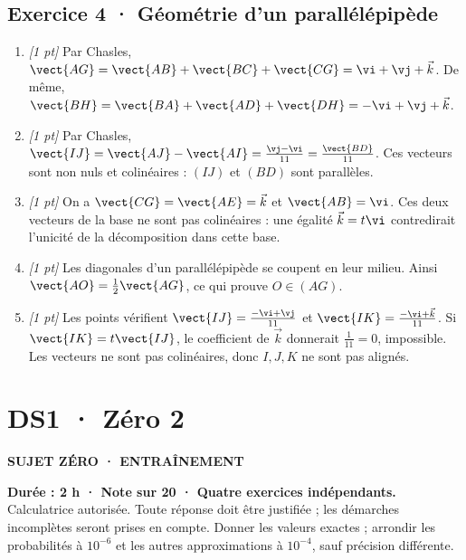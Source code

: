 \subsection*{Exercice 4 · Géométrie d'un parallélépipède}\begin{enumerate}

\item \textit{[1 pt]} Par Chasles, $\vect{AG}=\vect{AB}+\vect{BC}+\vect{CG}=\vi +\vj +\vec k$. De même, $\vect{BH}=\vect{BA}+\vect{AD}+\vect{DH}=-\vi +\vj +\vec k$.

\item \textit{[1 pt]} Par Chasles, $\vect{IJ}=\vect{AJ}-\vect{AI}=\frac{\vj -\vi }{11}=\frac{\vect{BD}}{11}$. Ces vecteurs sont non nuls et colinéaires : $(IJ)$ et $(BD)$ sont parallèles.

\item \textit{[1 pt]} On a $\vect{CG}=\vect{AE}=\vec k$ et $\vect{AB}=\vi $. Ces deux vecteurs de la base ne sont pas colinéaires : une égalité $\vec k=t\vi $ contredirait l'unicité de la décomposition dans cette base.

\item \textit{[1 pt]} Les diagonales d'un parallélépipède se coupent en leur milieu. Ainsi $\vect{AO}=\frac12\vect{AG}$, ce qui prouve $O\in(AG)$.

\item \textit{[1 pt]} Les points vérifient $\vect{IJ}=\frac{-\vi +\vj }{11}$ et $\vect{IK}=\frac{-\vi +\vec k}{11}$. Si $\vect{IK}=t\vect{IJ}$, le coefficient de $\vec k$ donnerait $\frac{1}{11}=0$, impossible. Les vecteurs ne sont pas colinéaires, donc $I,J,K$ ne sont pas alignés.

\end{enumerate}

\fi

\clearpage{}\label{sujet:1-2}

\section*{DS1 · Zéro 2}

{\sffamily\bfseries\color{teal}SUJET ZÉRO · ENTRAÎNEMENT\par}

\textbf{Durée : 2 h · Note sur 20 · Quatre exercices indépendants.}\\Calculatrice autorisée. Toute réponse doit être justifiée ; les démarches incomplètes seront prises en compte. Donner les valeurs exactes ; arrondir les probabilités à $10^{-6}$ et les autres approximations à $10^{-4}$, sauf précision différente.

